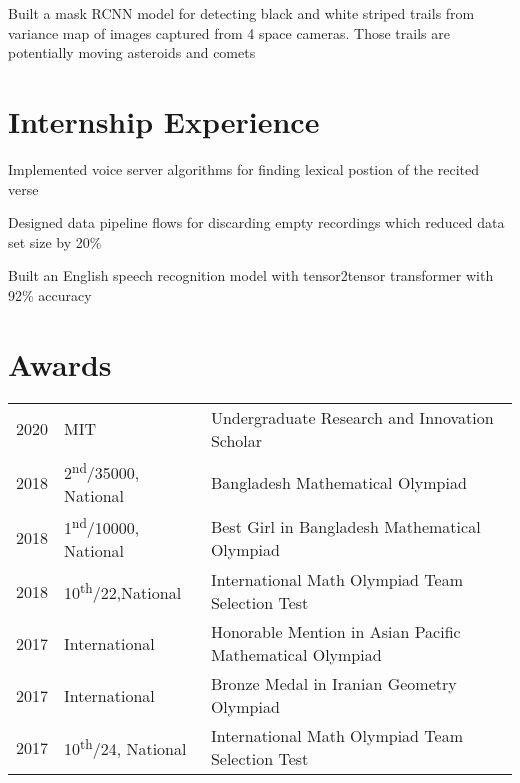 \documentclass[]{deedy-resume-openfont}
\begin{document}
\begin{minipage}[t]{0.66\textwidth}
\begin{tightemize}
\item Built a mask RCNN model for detecting black and white striped trails from variance map of images captured from 4 space cameras. Those trails are potentially moving asteroids and comets
\end{tightemize}
\sectionsep


\section{Internship Experience}
\begin{tightemize}
\item Implemented voice server algorithms for finding lexical postion of the recited verse
\item Designed data pipeline flows for discarding empty recordings which reduced data set size by 20\%
\item Built an English speech recognition model with tensor2tensor transformer with 92\% accuracy
\end{tightemize}
\sectionsep



\section{Awards} 
\begin{tabular}{rll}
2020	     & MIT  & Undergraduate Research and Innovation Scholar\\
2018	     & 2\textsuperscript{nd}/35000, National  & Bangladesh Mathematical Olympiad\\
2018	     & 1\textsuperscript{nd}/10000, National & Best Girl in Bangladesh Mathematical Olympiad\\
2018     & 10\textsuperscript{th}/22,National  & International Math Olympiad Team Selection Test  \\
2017     & International & Honorable Mention in Asian Pacific Mathematical Olympiad \\
2017     & International & Bronze Medal in Iranian Geometry Olympiad \\
2017     & 10\textsuperscript{th}/24, National & International Math Olympiad Team Selection Test \\
\end{tabular}
\sectionsep


\end{minipage} 
\end{document}
